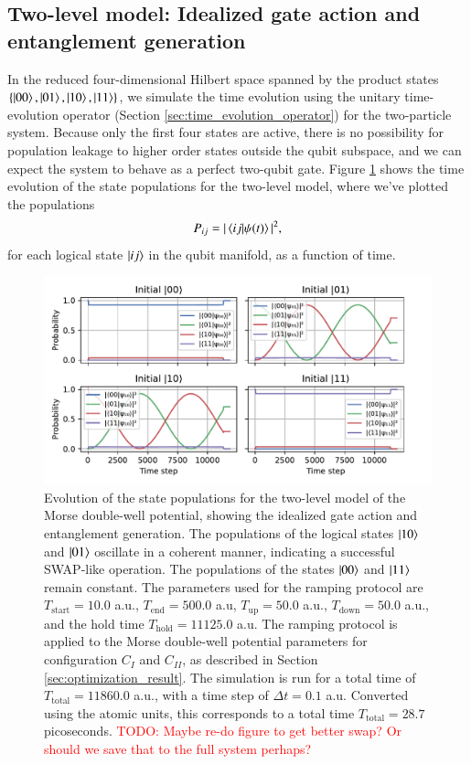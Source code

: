 \documentclass{subfiles}
\begin{document}
\subsection{Two-level model: Idealized gate action and entanglement generation}
In the reduced four-dimensional Hilbert space spanned by the product states $\{\ket{00}, \ket{01}, \ket{10}, \ket{11}\}$, we simulate the time evolution using the unitary time-evolution operator (Section \ref{sec:time_evolution_operator}) for the two-particle system. Because only the first four states are active, there is no possibility for population leakage to higher order states outside the qubit subspace, and we can expect the system to behave as a perfect two-qubit gate. Figure \ref{fig:time_evolution_2_basefunctions} shows the time evolution of the state populations for the two-level model, where we've plotted the populations 
\begin{align*}
    P_{ij} = |\braket{ij| \psi(t)}|^2,
\end{align*}
for each logical state $\ket{ij}$ in the qubit manifold, as a function of time.
\begin{figure}[h!]
    \centering
    \includegraphics[width=1.0\textwidth]{figs/time_evolution_2_basefunctions_1806.pdf}
    \caption{Evolution of the state populations for the two-level model of the Morse double-well potential, showing the idealized gate action and entanglement generation. The populations of the logical states $\ket{10}$ and $\ket{01}$ oscillate in a coherent manner, indicating a successful SWAP-like operation. The populations of the states $\ket{00}$ and $\ket{11}$ remain constant. The parameters used for the ramping protocol are $T_{\text{start}} = 10.0$ a.u., $T_{\text{end}} = 500.0$ a.u, $T_{\text{up}} = 50.0$ a.u., $T_{\text{down}} = 50.0$ a.u., and the hold time $T_{\text{hold}} = 11125.0$ a.u. The ramping protocol is applied to the Morse double-well potential parameters for configuration $C_I$ and $C_{II}$, as described in Section \ref{sec:optimization_result}. The simulation is run for a total time of $T_{\text{total}} = 11860.0$ a.u., with a time step of $\Delta t = 0.1$ a.u. Converted using the atomic units, this corresponds to a total time $T_{\text{total}}=28.7$ picoseconds. \textcolor{red}{TODO: Maybe re-do figure to get better swap? Or should we save that to the full system perhaps?}}
    \label{fig:time_evolution_2_basefunctions}
\end{figure}
\\ 
\end{document}
